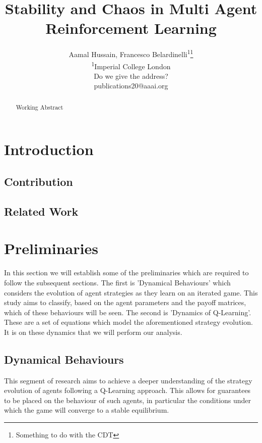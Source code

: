 \documentclass[letterpaper]{article} %
\title{Stability and Chaos in Multi Agent Reinforcement Learning}
\author{Aamal Hussain, Francesco Belardinelli\textsuperscript{\rm 1}\thanks{Something to do with the
CDT}\\ %
\textsuperscript{\rm 1}Imperial College London\\ %
Do we give the address? \fb{normally the submission is blind.}\\
publications20@aaai.org %
}
\begin{document}
\maketitle

\begin{abstract}
Working Abstract
\end{abstract}

\section{Introduction}

\subsection{Contribution}


\subsection{Related Work}


\section{Preliminaries}

In this section we will establish some of the preliminaries which are
required to follow the subsequent sections. The first is 'Dynamical
Behaviours'  which considers the evolution of agent strategies as they
learn on an iterated game. This study aims to classify, based on the
agent parameters and the payoff matrices, which of these behaviours
will be seen. The second is 'Dynamics of Q-Learning'. These are a set
of equations which model the aforementioned strategy evolution. It is
on these dynamics that we will perform our analysis.

\subsection{Dynamical Behaviours}

 This segment of research aims to achieve a deeper understanding
    of the strategy evolution of agents following a Q-Learning
    approach. This allows for guarantees to be placed on the behaviour
    of such agents, in particular the conditions under which the game
    will converge to a stable equilibrium.
\end{document}
